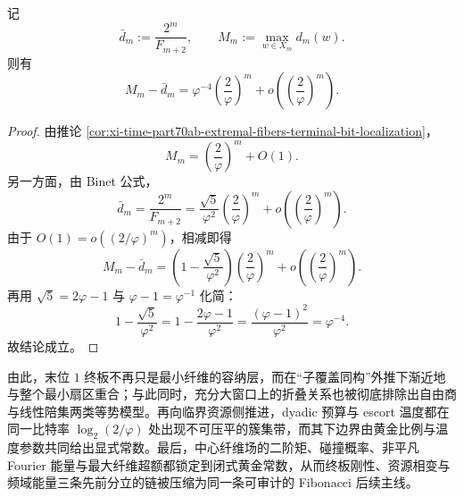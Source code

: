 \begin{corollary}[最大纤维超额的精确主项]\label{cor:xi-time-part70d-maxfiber-excess-exact-main-term}
记
\[
\bar d_m:=\frac{2^m}{F_{m+2}},
\qquad
M_m:=\max_{w\in X_m}d_m(w).
\]
则有
\[
M_m-\bar d_m
=
\varphi^{-4}\left(\frac{2}{\varphi}\right)^m
+o\!\left(\left(\frac{2}{\varphi}\right)^m\right).
\]
\end{corollary}
\begin{proof}
由推论 \ref{cor:xi-time-part70ab-extremal-fibers-terminal-bit-localization}，
\[
M_m=\left(\frac{2}{\varphi}\right)^m+O(1).
\]
另一方面，由 Binet 公式，
\[
\bar d_m
=
\frac{2^m}{F_{m+2}}
=
\frac{\sqrt5}{\varphi^2}\left(\frac{2}{\varphi}\right)^m
+o\!\left(\left(\frac{2}{\varphi}\right)^m\right).
\]
由于 \(O(1)=o((2/\varphi)^m)\)，相减即得
\[
M_m-\bar d_m
=
\left(1-\frac{\sqrt5}{\varphi^2}\right)\left(\frac{2}{\varphi}\right)^m
+o\!\left(\left(\frac{2}{\varphi}\right)^m\right).
\]
再用 \(\sqrt5=2\varphi-1\) 与 \(\varphi-1=\varphi^{-1}\) 化简：
\[
1-\frac{\sqrt5}{\varphi^2}
=
1-\frac{2\varphi-1}{\varphi^2}
=
\frac{(\varphi-1)^2}{\varphi^2}
=
\varphi^{-4}.
\]
故结论成立。
\end{proof}

\noindent
由此，末位 \(1\) 终板不再只是最小纤维的容纳层，而在“子覆盖同构”外推下渐近地与整个最小扇区重合；与此同时，充分大窗口上的折叠关系也被彻底排除出自由商与线性陪集两类等势模型。再向临界资源侧推进，dyadic 预算与 escort 温度都在同一比特率 \(\log_2(2/\varphi)\) 处出现不可压平的簇集带，而其下边界由黄金比例与温度参数共同给出显式常数。最后，中心纤维场的二阶矩、碰撞概率、非平凡 Fourier 能量与最大纤维超额都锁定到闭式黄金常数，从而终板刚性、资源相变与频域能量三条先前分立的链被压缩为同一条可审计的 Fibonacci 后续主线。

\endinput
